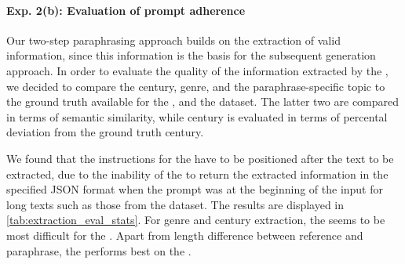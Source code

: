 


\paragraph{Exp. 2(b): Evaluation of prompt adherence}
Our two-step paraphrasing approach builds on the extraction of valid information, since this information is the basis for the subsequent generation approach.
In order to evaluate the quality of the information extracted by the \pextractor{}, we decided to compare the century, genre, and the paraphrase-specific topic to the ground truth available for the \dataBlog{}, \dataGutenberg{} and the \dataStudent{} dataset.
The latter two are compared in terms of semantic similarity, while century is evaluated in terms of percental deviation from the ground truth century.

We found that the instructions for the \pextractor{} have to be positioned after the text to be extracted, due to the inability of the \pextractor{} to return the extracted information in the specified JSON format when the prompt was at the beginning of the input for long texts such as those from the \dataGutenberg{} dataset.
The results are displayed in \autoref{tab:extraction_eval_stats}.
For genre and century extraction, the \dataStudent{} seems to be most difficult for the \pextractor{}.
Apart from length difference between reference and paraphrase, the \pextractor{} performs best on the \dataGutenberg{}.

